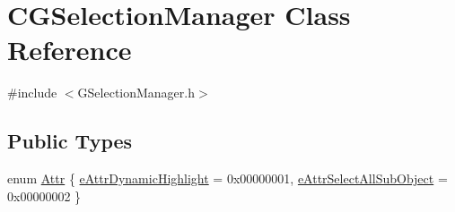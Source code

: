 \hypertarget{class_c_g_selection_manager}{}\section{C\+G\+Selection\+Manager Class Reference}
\label{class_c_g_selection_manager}


{\ttfamily \#include $<$G\+Selection\+Manager.\+h$>$}

\subsection*{Public Types}
\begin{DoxyCompactItemize}
\item 
enum \hyperlink{class_c_g_selection_manager_aab4b2c908e93e2d28ab119d441d70b18}{Attr} \{ \hyperlink{class_c_g_selection_manager_aab4b2c908e93e2d28ab119d441d70b18a29b5aeff790fa542d67a6d8aaa38d5a7}{e\+Attr\+Dynamic\+Highlight} = 0x00000001, 
\hyperlink{class_c_g_selection_manager_aab4b2c908e93e2d28ab119d441d70b18a9e17ca81225faa92b827e10d5bed659c}{e\+Attr\+Select\+All\+Sub\+Object} = 0x00000002
 \}
\end{DoxyCompactItemize}
